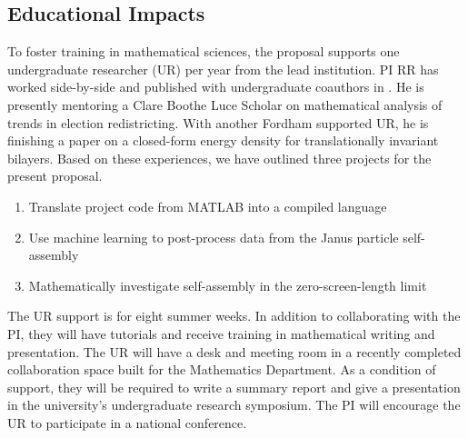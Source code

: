 \subsection{Educational Impacts}
\label{subsec:Educational_plans}
To foster training in mathematical sciences,
the proposal supports one undergraduate researcher (UR) per year
from the lead institution.
PI RR has worked side-by-side and
published with undergraduate coauthors in
\cite{RYHAM20112929, RyWaCo13, RyKlYaCo16}.
He is presently mentoring a Clare Boothe Luce Scholar 
on mathematical analysis of trends in election redistricting.
With another Fordham supported UR,
he is finishing a paper on a closed-form 
energy density for translationally invariant bilayers. 
Based on these experiences, we have outlined three projects for the present proposal.
\begin{enumerate}[noitemsep]
\item Translate project code from MATLAB into a compiled language   

\item Use machine learning to post-process data from the Janus particle self-assembly

\item Mathematically investigate self-assembly in the zero-screen-length limit

  
\end{enumerate}
The UR support is for eight summer weeks. 
In addition to collaborating with the PI,
they will have tutorials and receive training in
mathematical writing and presentation.
The UR will have a desk and meeting room
in a recently completed collaboration space
built for the Mathematics Department. 
As a condition of support, 
they will be required to write a summary report and
give a presentation in the university's undergraduate
research symposium.  The PI 
will encourage the
UR to participate in a national conference.

